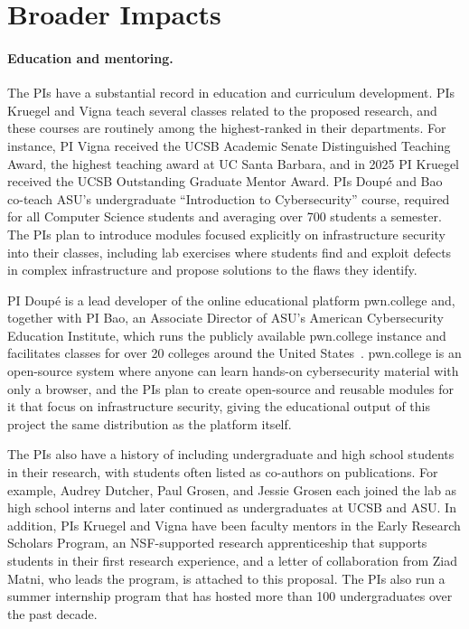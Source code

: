 \section{Broader Impacts}
\label{sec:broader}

\paragraph{Education and mentoring.}
The PIs have a substantial record in education and curriculum development.
PIs Kruegel and Vigna teach several classes related to the proposed research,
and these courses are routinely among the highest-ranked in their
departments. For instance, PI Vigna received the UCSB Academic Senate
Distinguished Teaching Award, the highest teaching award at UC Santa Barbara,
and in 2025 PI Kruegel received the UCSB Outstanding Graduate Mentor Award.
PIs Doup\'e and Bao co-teach ASU's undergraduate ``Introduction to
Cybersecurity'' course, required for all Computer Science students and
averaging over 700 students a semester. The PIs plan to introduce modules
focused explicitly on infrastructure security into their classes, including
lab exercises where students find and exploit defects in complex
infrastructure and propose solutions to the flaws they identify.

PI Doup\'e is a lead developer of the online educational platform
pwn.college and, together with PI Bao, an Associate Director of ASU's
American Cybersecurity Education Institute, which runs the publicly available
pwn.college instance and facilitates classes for over 20 colleges around the
United States~\cite{nelson26:pwncollegefiveyears,shoshitaishvili26:luminarium,nelson25:sensai}.
pwn.college is an open-source system where anyone can learn hands-on
cybersecurity material with only a browser, and the PIs plan to create
open-source and reusable modules for it that focus on infrastructure
security, giving the educational output of this project the same distribution
as the platform itself.

The PIs also have a history of including undergraduate and high school
students in their research, with students often listed as co-authors on
publications. For example, Audrey Dutcher, Paul Grosen, and Jessie Grosen
each joined the lab as high school interns and later continued as
undergraduates at UCSB and ASU. In addition, PIs Kruegel and Vigna have been
faculty mentors in the Early Research Scholars Program, an NSF-supported
research apprenticeship that supports students in their first research
experience, and a letter of collaboration from Ziad Matni, who leads the
program, is attached to this proposal. The PIs also run a summer internship
program that has hosted more than 100 undergraduates over the past decade.

